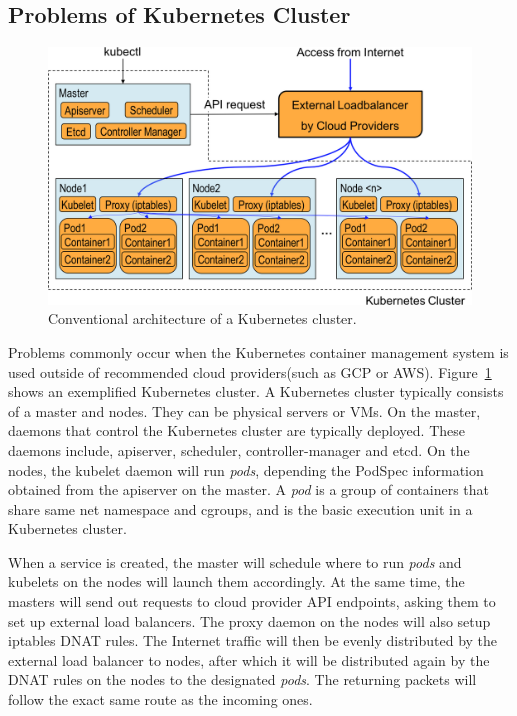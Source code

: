 \subsection{Problems of Kubernetes Cluster}

\begin{figure}
\includegraphics[width=\columnwidth]{Figs/K8sConventional}
\caption{Conventional architecture of a Kubernetes cluster.}
\label{fig:K8sConventional}
\end{figure}

Problems commonly occur when the Kubernetes container management system is used outside of recommended cloud providers(such as GCP or AWS).
Figure~\ref{fig:K8sConventional} shows an exemplified Kubernetes cluster.
A Kubernetes cluster typically consists of a master and nodes. They can be physical servers or VMs.
On the master, daemons that control the Kubernetes cluster are typically deployed. 
These daemons include, apiserver, scheduler, controller-manager and etcd. 
On the nodes, the kubelet daemon will run {\it pods}, depending the PodSpec information obtained from the apiserver on the master.
A {\em pod} is a group of containers that share same net namespace and cgroups, 
and is the basic execution unit in a Kubernetes cluster.

When a service is created, the master will schedule where to run {\em pods} and kubelets on the nodes will launch them accordingly.
At the same time, the masters will send out requests to cloud provider API endpoints, asking them to set up external load balancers.
The proxy daemon on the nodes will also setup iptables DNAT\cite{MartinA.Brown2017} rules. 
The Internet traffic will then be evenly distributed by the external load balancer to nodes, 
after which it will be distributed again by the DNAT rules on the nodes to the designated {\em pods}. 
The returning packets will follow the exact same route as the incoming ones.

